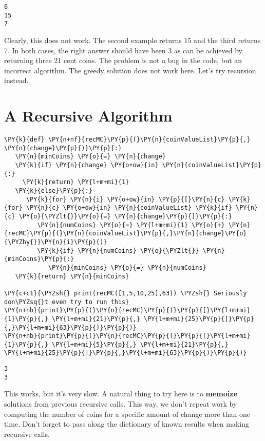\begin{Verbatim}
6
15
7
\end{Verbatim}


Clearly, this does not work.
The second example returns 15 and the third returns 7.
In both cases, the right answer should have been 3 as can be achieved by returning three 21 cent coins.
The problem is not a bug in the code, but an incorrect algorithm.
The greedy solution does not work here.
Let's try recursion instead.

\section{A Recursive Algorithm}


\begin{Verbatim}[commandchars=\\\{\}]
\PY{k}{def} \PY{n+nf}{recMC}\PY{p}{(}\PY{n}{coinValueList}\PY{p}{,} \PY{n}{change}\PY{p}{)}\PY{p}{:}
   \PY{n}{minCoins} \PY{o}{=} \PY{n}{change}
   \PY{k}{if} \PY{n}{change} \PY{o+ow}{in} \PY{n}{coinValueList}\PY{p}{:}
     \PY{k}{return} \PY{l+m+mi}{1}
   \PY{k}{else}\PY{p}{:}
      \PY{k}{for} \PY{n}{i} \PY{o+ow}{in} \PY{p}{[}\PY{n}{c} \PY{k}{for} \PY{n}{c} \PY{o+ow}{in} \PY{n}{coinValueList} \PY{k}{if} \PY{n}{c} \PY{o}{\PYZlt{}}\PY{o}{=} \PY{n}{change}\PY{p}{]}\PY{p}{:}
         \PY{n}{numCoins} \PY{o}{=} \PY{l+m+mi}{1} \PY{o}{+} \PY{n}{recMC}\PY{p}{(}\PY{n}{coinValueList}\PY{p}{,}\PY{n}{change}\PY{o}{\PYZhy{}}\PY{n}{i}\PY{p}{)}
         \PY{k}{if} \PY{n}{numCoins} \PY{o}{\PYZlt{}} \PY{n}{minCoins}\PY{p}{:}
            \PY{n}{minCoins} \PY{o}{=} \PY{n}{numCoins}
   \PY{k}{return} \PY{n}{minCoins}

\PY{c+c1}{\PYZsh{} print(recMC([1,5,10,25],63)) \PYZsh{} Seriously don\PYZsq{}t even try to run this}
\PY{n+nb}{print}\PY{p}{(}\PY{n}{recMC}\PY{p}{(}\PY{p}{[}\PY{l+m+mi}{1}\PY{p}{,} \PY{l+m+mi}{21}\PY{p}{,} \PY{l+m+mi}{25}\PY{p}{]}\PY{p}{,}\PY{l+m+mi}{63}\PY{p}{)}\PY{p}{)}
\PY{n+nb}{print}\PY{p}{(}\PY{n}{recMC}\PY{p}{(}\PY{p}{[}\PY{l+m+mi}{1}\PY{p}{,} \PY{l+m+mi}{5}\PY{p}{,} \PY{l+m+mi}{21}\PY{p}{,} \PY{l+m+mi}{25}\PY{p}{]}\PY{p}{,}\PY{l+m+mi}{63}\PY{p}{)}\PY{p}{)}
\end{Verbatim}

\begin{Verbatim}
3
3
\end{Verbatim}


This works, but it's very slow.  A natural thing to try here is to \textbf{memoize} solutions from previous recursive calls.
This way, we don't repeat work by computing the number of coins for a specific amount of change more than one time.
Don't forget to pass along the dictionary of known results when making recursive calls.

